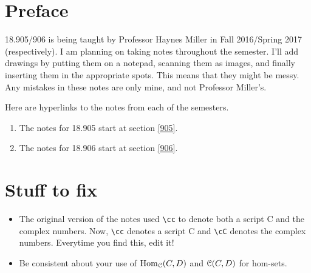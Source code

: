\cleardoublepage
\section*{Preface}
18.905/906 is being taught by Professor Haynes Miller in Fall 2016/Spring 2017 (respectively). I am planning on taking notes throughout the semester. I'll add drawings by putting them on a notepad, scanning them as images, and finally inserting them in the appropriate spots. This means that they might be messy. Any mistakes in these notes are only mine, and not Professor Miller's.

Here are hyperlinks to the notes from each of the semesters.
    \begin{enumerate}
        \item The notes for 18.905 start at section \ref{905}.
        \item The notes for 18.906 start at section \ref{906}.
    \end{enumerate}

\section*{Stuff to fix}
\begin{itemize}
    \item The original version of the notes used
	\verb|\cc| to denote both a script C and the complex numbers.
	Now, \verb|\cc| denotes a script C and \verb|\cC| denotes the complex numbers.
	Everytime you find this, edit it!
    \item Be consistent about your use of $\operatorname{Hom}_\mathcal C(C,D)$ and $\mathcal C(C,D)$ for hom-sets.
\end{itemize}
